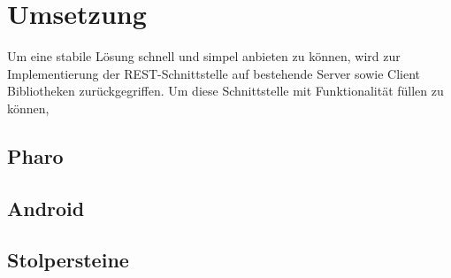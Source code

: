 \section{Umsetzung}
Um eine stabile Lösung schnell und simpel anbieten zu können, wird zur Implementierung der REST-Schnittstelle auf bestehende Server sowie Client Bibliotheken zurückgegriffen. Um diese Schnittstelle mit Funktionalität füllen zu können, 
\subsection{Pharo}
\subsection{Android}

\subsection{Stolpersteine}